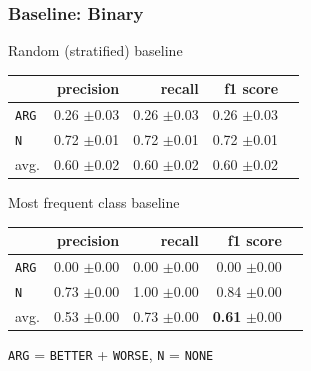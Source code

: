 \documentclass[11pt,aspectratio=169,usenames,dvipsnames]{beamer}
\begin{document}
    \begin{frame}[t]
        \frametitle{Baseline: Binary}


        \begin{minipage}{.5\linewidth}

            \centering
            Random (stratified) baseline\newline\newline
            \begin{tabularx}{0.97\linewidth}{Xrrrr}
                \toprule
                & precision & recall & f1 score                              \\ \midrule
                \texttt{ARG}  & 0.26 \scriptsize{$\pm$0.03} & 0.26 \scriptsize{$\pm$0.03} & 0.26 \scriptsize{$\pm$0.03}          \\
                \texttt{N} & 0.72 \scriptsize{$\pm$0.01} & 0.72 \scriptsize{$\pm$0.01} & 0.72 \scriptsize{$\pm$0.01}          \\
                avg. & 0.60 \scriptsize{$\pm$0.02} & 0.60 \scriptsize{$\pm$0.02} & 0.60 \scriptsize{$\pm$0.02} \\
                \bottomrule
            \end{tabularx}

        \end{minipage}%
        \begin{minipage}{.5\linewidth}
            \centering
            Most frequent class baseline\newline\newline
            \begin{tabularx}{0.97\linewidth}{Xrrrr}
                \toprule
                & precision & recall & f1 score                     \\ \midrule
                \texttt{ARG}  & 0.00 \scriptsize{$\pm$0.00} & 0.00 \scriptsize{$\pm$0.00} & 0.00 \scriptsize{$\pm$0.00} \\
                \texttt{N} & 0.73 \scriptsize{$\pm$0.00} & 1.00 \scriptsize{$\pm$0.00} & 0.84 \scriptsize{$\pm$0.00} \\
                avg. & 0.53 \scriptsize{$\pm$0.00} & 0.73 \scriptsize{$\pm$0.00} & \textbf{0.61} \scriptsize{$\pm$0.00} \\
                \bottomrule
            \end{tabularx}
        \end{minipage}\newline\newline
        \texttt{ARG} = \texttt{BETTER} + \texttt{WORSE}, \texttt{N} = \texttt{NONE}


    \end{frame}
\end{document}
